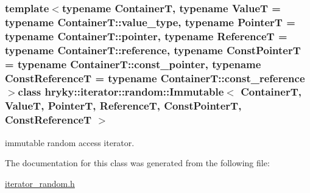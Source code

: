 \subsubsection*{template$<$typename Container\-T, typename Value\-T = typename Container\-T\-::value\-\_\-type, typename Pointer\-T = typename Container\-T\-::pointer, typename Reference\-T = typename Container\-T\-::reference, typename Const\-Pointer\-T = typename Container\-T\-::const\-\_\-pointer, typename Const\-Reference\-T = typename Container\-T\-::const\-\_\-reference$>$class hryky\-::iterator\-::random\-::\-Immutable$<$ Container\-T, Value\-T, Pointer\-T, Reference\-T, Const\-Pointer\-T, Const\-Reference\-T $>$}

immutable random access iterator. 

The documentation for this class was generated from the following file\-:\begin{DoxyCompactItemize}
\item 
\hyperlink{iterator__random_8h}{iterator\-\_\-random.\-h}\end{DoxyCompactItemize}
